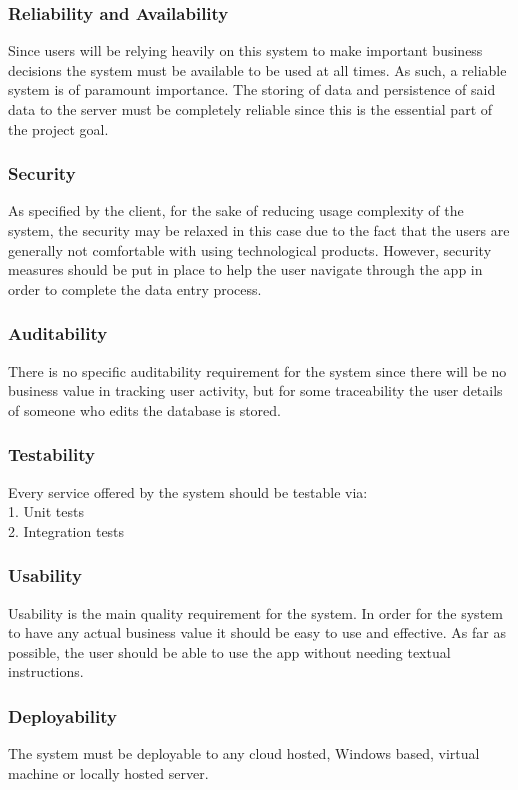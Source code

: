 \documentclass[11pt,a4paper,titlepage]{article}
\begin{document}
		\subsubsection{Reliability and Availability}
			Since users will be relying heavily on this system to make important business decisions the system must be available to be used at all times. As such, a reliable system is of paramount importance. The storing of data and persistence of said data to the server must be completely reliable since this is the essential part of the project goal.
		\subsubsection{Security}
			As specified by the client, for the sake of reducing usage complexity of the system, the security may be relaxed in this case due to the fact that the users are generally not comfortable with using technological products. However, security measures should be put in place to help the user navigate through the app in order to complete the data entry process.
		\subsubsection{Auditability}
			There is no specific auditability requirement for the system since there will be no business value in tracking user activity, but for some traceability the user details of someone who edits the database is stored.
		\subsubsection{Testability}
			Every service offered by the system should be testable via:\\
			1. Unit tests\\
			2. Integration tests
		\subsubsection{Usability}
			Usability is the main quality requirement for the system. In order for the system to have any actual business value it should be easy to use and effective. As far as possible, the user should be able to use the app without needing textual instructions.
		\subsubsection{Deployability}
			The system must be deployable to any cloud hosted, Windows based, virtual machine or locally hosted server.
\end{document}
